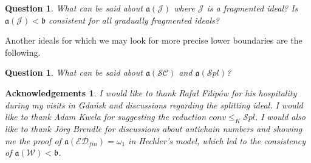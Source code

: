 \documentclass[a4paper]{amsart}
\newtheorem{question}[theorem]{Question}
\newtheorem*{acknowledgements}{Acknowledgements}
\newcommand{\aaa}{\mathfrak{a}}
\newcommand{\bbb}{\mathfrak{b}}
\newcommand{\J}{\mathcal{J}}
\newcommand{\ED}{\mathcal{ED}}
\newcommand{\SPL}{\mathcal{S}pl}
\newcommand{\conv}{conv}
\newcommand{\WANDER}{\mathcal{W}}
\newcommand{\SC}{\mathcal{SC}}
\begin{document}
\begin{question}
    What can be said about $\aaa(\J)$ where $\J$ is a fragmented ideal? Is $\aaa(\J)<\bbb$ consistent for all gradually fragmented ideals?
\end{question}
Another ideals for which we may look for more precise lower boundaries are the following.
\begin{question}
    What can be said about $\aaa(\SC)$ and $\aaa(\SPL)$?
\end{question}

\begin{acknowledgements}
I would like to thank Rafał Filipów for his hospitality during my visits in Gdańsk and discussions regarding the splitting ideal. I would like to thank Adam Kwela for suggesting the reduction $\conv\leq_{K}\SPL$. I would also like to thank J\"{o}rg Brendle for discussions about antichain numbers and showing me the proof of $\aaa(\ED_{fin})=\omega_{1}$ in Hechler's model, which led to the consistency of $\aaa(\WANDER)<\bbb$.
\end{acknowledgements}



 

\end{document}

